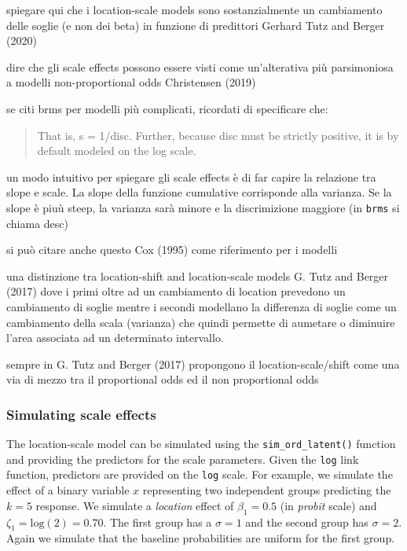 \documentclass[
  man,floatsintext]{apa6}
\begin{document}
spiegare qui che i location-scale models sono sostanzialmente un cambiamento delle soglie (e non dei beta) in funzione di predittori Gerhard Tutz and Berger (2020)

dire che gli scale effects possono essere visti come un'alterativa più parsimoniosa a modelli non-proportional odds Christensen (2019)

se citi brms per modelli più complicati, ricordati di specificare che:

\begin{quote}
That is, s = 1/disc. Further, because disc must be strictly positive, it is by default modeled on the log scale.
\end{quote}

un modo intuitivo per spiegare gli scale effects è di far capire la relazione tra slope e scale. La slope della funzione cumulative corrisponde alla varianza. Se la slope è piuù steep, la varianza sarà minore e la discrimizione maggiore (in \texttt{brms} si chiama desc)

\scriptsize

\normalsize

si può citare anche questo Cox (1995) come riferimento per i modelli

una distinzione tra location-shift and location-scale models G. Tutz and Berger (2017) dove i primi oltre ad un cambiamento di location prevedono un cambiamento di soglie mentre i secondi modellano la differenza di soglie come un cambiamento della scala (varianza) che quindi permette di aumetare o diminuire l'area associata ad un determinato intervallo.

sempre in G. Tutz and Berger (2017) propongono il location-scale/shift come una via di mezzo tra il proportional odds ed il non proportional odds

\subsubsection{Simulating scale effects}\label{simulating-scale-effects}

The location-scale model can be simulated using the \texttt{sim\_ord\_latent()} function and providing the predictors for the scale parameters. Given the \texttt{log} link function, predictors are provided on the \texttt{log} scale. For example, we simulate the effect of a binary variable \(x\) representing two independent groups predicting the \(k = 5\) response. We simulate a \emph{location} effect of \(\beta_1 = 0.5\) (in \emph{probit} scale) and \(\zeta_1 = \text{log}(2) = 0.70\). The first group has a \(\sigma = 1\) and the second group has \(\sigma = 2\). Again we simulate that the baseline probabilities are uniform for the first group.
\end{document}

